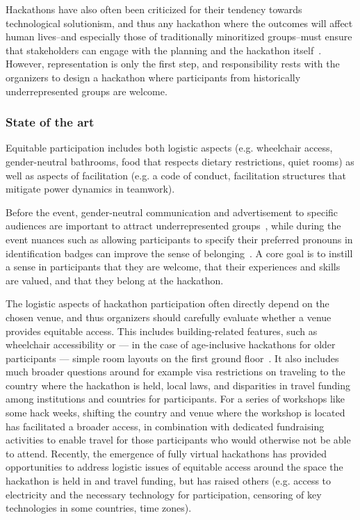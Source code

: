 \documentclass{ieeeaccess}
\begin{document}
Hackathons have also often been criticized for their tendency towards technological solutionism, and thus any hackathon where the outcomes will affect human lives--and especially those of traditionally minoritized groups--must ensure that stakeholders can engage with the planning and the hackathon itself~\cite{d2016towards}. 
However, representation is only the first step, and responsibility rests with the organizers to design a hackathon where participants from historically underrepresented groups are welcome.

\subsubsection{State of the art}
Equitable participation includes both logistic aspects (e.g. wheelchair access, gender-neutral bathrooms, food that respects dietary restrictions, quiet rooms) as well as aspects of facilitation (e.g. a code of conduct, facilitation structures that mitigate power dynamics in teamwork). 

Before the event, gender-neutral communication and advertisement to specific audiences are important to attract underrepresented groups~\cite{ferraz2019case}, while during the event nuances such as allowing participants to specify their preferred pronouns in identification badges can improve the sense of belonging~\cite{prado2021trans}. 
A core goal is to instill a sense in participants that they are welcome, that their experiences and skills are valued, and that they belong at the hackathon.

The logistic aspects of hackathon participation often directly depend on the chosen venue, and thus organizers should carefully evaluate whether a venue provides equitable access. 
This includes building-related features, such as wheelchair accessibility or --- in the case of age-inclusive hackathons for older participants --- simple room layouts on the first ground floor~\cite{kopec2018older}.
It also includes much broader questions around for example visa restrictions on traveling to the country where the hackathon is held, local laws, and disparities in travel funding among institutions and countries for participants. 
For a series of workshops like some hack weeks, shifting the country and venue where the workshop is located has facilitated a broader access, in combination with dedicated fundraising activities to enable travel for those participants who would otherwise not be able to attend. 
Recently, the emergence of fully virtual hackathons has provided opportunities to address logistic issues of equitable access around the space the hackathon is held in and travel funding, but has raised others (e.g. access to electricity and the necessary technology for participation, censoring of key technologies in some countries, time zones). 
\end{document}
